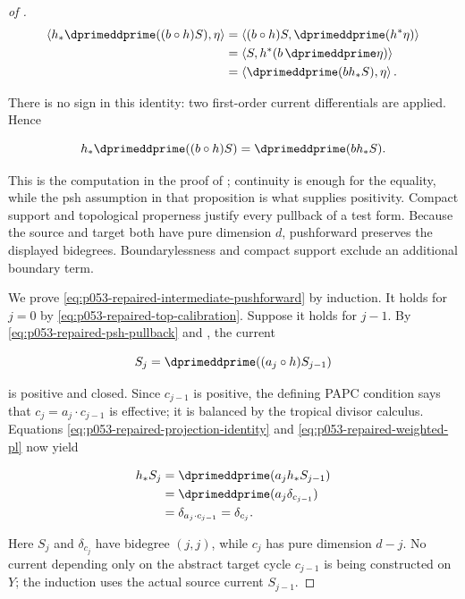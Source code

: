 \begin{proof}[of
]
\begin{align}
 \left\langle h_*\dprimeddprime((b\circ h)S),\eta\right\rangle
 &=\left\langle (b\circ h)S,
                   \dprimeddprime(h^*\eta)\right\rangle \\
 &=\left\langle S,h^*(b\,\dprimeddprime\eta)\right\rangle \\
 &=\left\langle \dprimeddprime(bh_*S),\eta\right\rangle.
 \label{eq:p053-repaired-continuous-projection}
\end{align}

There is no sign in this identity: two first-order current differentials are
applied.  Hence

\begin{equation}
 h_*\dprimeddprime((b\circ h)S)
 =\dprimeddprime(bh_*S).
 \label{eq:p053-repaired-projection-identity}
\end{equation}

This is the computation in the proof of
\cite[Proposition~8.5.6]{CLD25}; continuity is enough for the equality, while
the psh assumption in that proposition is what supplies positivity.  Compact
support and topological properness justify every pullback of a test form.
Because the source and target both have pure dimension \(d\), pushforward
preserves the displayed bidegrees.  Boundarylessness and compact support
exclude an additional boundary term.

We prove \eqref{eq:p053-repaired-intermediate-pushforward} by induction.  It
holds for \(j=0\) by \eqref{eq:p053-repaired-top-calibration}.  Suppose it
holds for \(j-1\).  By \eqref{eq:p053-repaired-psh-pullback} and
\cite[Lemma~8.5.5]{CLD25}, the current

\[
 S_j=\dprimeddprime((a_j\circ h)S_{j-1})
\]

is positive and closed.  Since \(c_{j-1}\) is positive, the defining PAPC
condition says that \(c_j=a_j\cdot c_{j-1}\) is effective; it is balanced by
the tropical divisor calculus.  Equations
\eqref{eq:p053-repaired-projection-identity} and
\eqref{eq:p053-repaired-weighted-pl} now yield

\begin{align}
 h_*S_j
 &=\dprimeddprime(a_jh_*S_{j-1}) \\
 &=\dprimeddprime(a_j\delta_{c_{j-1}}) \\
 &=\delta_{a_j\cdot c_{j-1}}
 =\delta_{c_j}.
 \label{eq:p053-repaired-projection-induction}
\end{align}

Here \(S_j\) and \(\delta_{c_j}\) have bidegree \((j,j)\), while \(c_j\)
has pure dimension \(d-j\).  No current depending only on the abstract
target cycle \(c_{j-1}\) is being constructed on \(Y\); the induction uses
the actual source current \(S_{j-1}\).


\end{proof}
